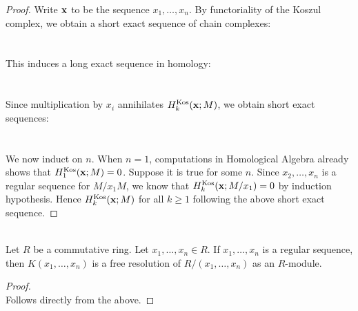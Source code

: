 \documentclass[a4paper]{article}
\begin{document}
\begin{prp}{}{}
\begin{proof}
Write $\bold{x}$ to be the sequence $x_1,\dots,x_n$. By functoriality of the Koszul complex, we obtain a short exact sequence of chain complexes: \\
\\~\\
This induces a long exact sequence in homology: \\
\\~\\
Since multiplication by $x_i$ annihilates $H_k^\text{Kos}(\bold{x};M)$, we obtain short exact sequences: \\
\\~\\
We now induct on $n$. When $n=1$, computations in Homological Algebra already shows that $H_1^\text{Kos}(\bold{x};M)=0$. Suppose it is true for some $n$. Since $x_2,\dots,x_n$ is a regular sequence for $M/x_1M$, we know that $H_k^\text{Kos}(\bold{x};M/x_1)=0$ by induction hypothesis. Hence $H_k^\text{Kos}(\bold{x};M)$ for all $k\geq 1$ following the above short exact sequence. 
\end{proof}
\end{prp}

\begin{crl}{}{}\\
Let $R$ be a commutative ring. Let $x_1,\dots,x_n\in R$. If $x_1,\dots,x_n$ is a regular sequence, then $K(x_1,\dots,x_n)$ is a free resolution of $R/(x_1,\dots,x_n)$ as an $R$-module. 
\begin{proof}\\
Follows directly from the above. 
\end{proof}
\end{crl}
\end{document}

